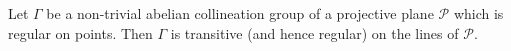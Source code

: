 Let $\Gamma$ be a non-trivial abelian collineation group of a projective plane $\mathcal{P}$ which is regular on points. Then $\Gamma$ is transitive (and hence regular) on the lines of $\mathcal{P}$.
